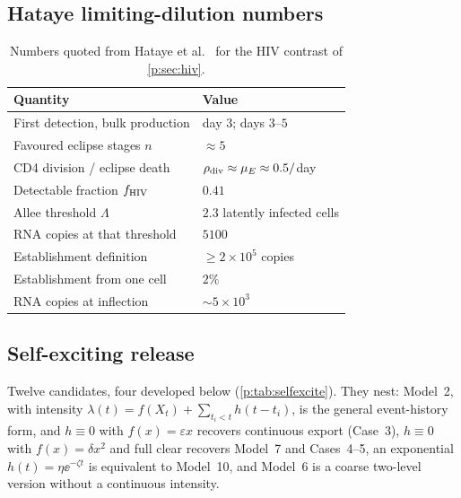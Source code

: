 \subsection{Hataye limiting-dilution numbers}

\begin{table}[htbp]
\centering
\renewcommand{\arraystretch}{1.12}
\small
\begin{tabular}{@{}ll@{}}
\toprule
Quantity & Value \\
\midrule
First detection, bulk production & day $3$; days $3$--$5$ \\
Favoured eclipse stages $n$ & $\approx5$ \\
CD4 division / eclipse death & $\rho_{\rm div}\approx\mu_E\approx0.5/$day \\
Detectable fraction $f_{\rm HIV}$ & $0.41$ \\
Allee threshold $\Lambda$ & $2.3$ latently infected cells \\
RNA copies at that threshold & $5100$ \\
Establishment definition & $\ge2\times10^5$ copies \\
Establishment from one cell & $2\%$ \\
RNA copies at inflection & $\sim5\times10^3$ \\
\bottomrule
\end{tabular}
\caption{Numbers quoted from Hataye et al.\ \cite{hataye2019principles} for
the HIV contrast of \cref{p:sec:hiv}.}
\label{p:tab:hataye}
\end{table}

\subsection{Self-exciting release}

Twelve candidates, four developed below (\cref{p:tab:selfexcite}). They
nest: Model~2, with intensity $\lambda(t)=f(X_t)+\sum_{t_i<t}h(t-t_i)$, is
the general event-history form, and $h\equiv0$ with $f(x)=\varepsilon x$
recovers continuous export (Case~3), $h\equiv0$ with $f(x)=\delta x^2$ and
full clear recovers Model~7 and Cases~4--5, an exponential
$h(t)=\eta\ee^{-\zeta t}$ is equivalent to Model~10, and Model~6 is a coarse
two-level version without a continuous intensity.

